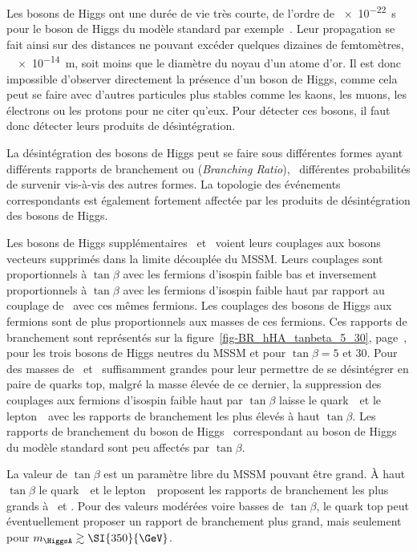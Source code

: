 Les bosons de Higgs ont une durée de vie très courte, de l'ordre de \SI{e-22}{\second} pour le boson de Higgs du modèle standard par exemple~\cite{PDG_booklet_2020}.
Leur propagation se fait ainsi sur des distances ne pouvant excéder quelques dizaines de femtomètres, \ie\ \SI{e-14}{\meter}, soit moins que le diamètre du noyau d'un atome d'or.
Il est donc impossible d'observer directement la présence d'un boson de Higgs, comme cela peut se faire avec d'autres particules plus stables comme les kaons, les muons, les électrons ou les protons pour ne citer qu'eux.
Pour détecter ces bosons, il faut donc détecter leurs produits de désintégration.
\par La désintégration des bosons de Higgs peut se faire sous différentes formes ayant différents rapports de branchement ou \BR{} (\emph{Branching Ratio}), \ie\ différentes probabilités de survenir vis-à-vis des autres formes.
La topologie des événements correspondants est également fortement affectée par les produits de désintégration des bosons de Higgs.
\par Les bosons de Higgs supplémentaires \Higgs\ et \HiggsA\ voient leurs couplages aux bosons vecteurs supprimés dans la limite découplée du MSSM.
Leurs couplages sont proportionnels à $\tan\beta$ avec les fermions d'isospin faible bas et inversement proportionnels à $\tan\beta$ avec les fermions d'isospin faible haut par rapport au couplage de \higgs\ avec ces mêmes fermions.
Les couplages des bosons de Higgs aux fermions sont de plus proportionnels aux masses de ces fermions.
Ces rapports de branchement sont représentés sur la figure~\ref{fig-BR_hHA_tanbeta_5_30}, page~\pageref{fig-BR_hHA_tanbeta_5_30}, pour les trois bosons de Higgs neutres du MSSM et pour $\tan\beta=5$ et $30$.
Pour des masses de \Higgs\ et \HiggsA\ suffisamment grandes pour leur permettre de se désintégrer en paire de quarks top, malgré la masse élevée de ce dernier, la suppression des couplages aux fermions d'isospin faible haut par $\tan\beta$ laisse le quark~\quarkb\ et le lepton~\tau\ avec les rapports de branchement les plus élevés à haut $\tan\beta$.
Les rapports de branchement du boson de Higgs \higgs\ correspondant au boson de Higgs du modèle standard sont peu affectés par $\tan\beta$.
\par La valeur de $\tan\beta$ est un paramètre libre du MSSM pouvant être grand.
À haut $\tan\beta$ le quark~\quarkb\ et le lepton~\tau\ proposent les rapports de branchement les plus grands à \Higgs\ et \HiggsA.
Pour des valeurs modérées voire basses de $\tan\beta$, le quark top peut éventuellement proposer un rapport de branchement plus grand, mais seulement pour $m_{\HiggsA}\gtrsim\SI{350}{\GeV}$.
